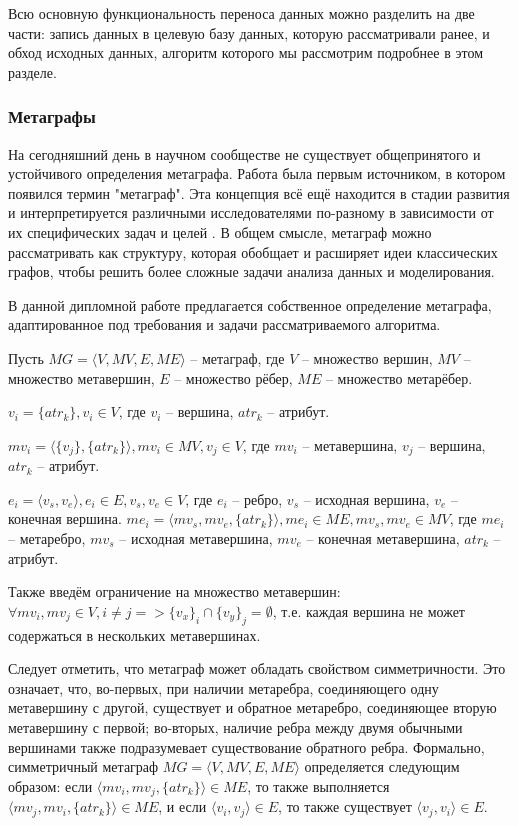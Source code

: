Всю основную функциональность переноса данных можно разделить на две части: запись данных в целевую базу данных, которую рассматривали ранее, и обход исходных данных, алгоритм которого мы рассмотрим подробнее в этом разделе.

\subsubsection{Метаграфы}
На сегодняшний день в научном сообществе не существует общепринятого и устойчивого определения метаграфа. Работа \cite{metagraphs_1} была первым источником, в котором появился термин "метаграф". Эта концепция всё ещё находится в стадии развития и интерпретируется различными исследователями по-разному в зависимости от их специфических задач и целей \cite{metagraphs_2, metagraphs_3, metagraphs_4, metagraphs_5}. В общем смысле, метаграф можно рассматривать как структуру, которая обобщает и расширяет идеи классических графов, чтобы решить более сложные задачи анализа данных и моделирования.

В данной дипломной работе предлагается собственное определение метаграфа, адаптированное под требования и задачи рассматриваемого алгоритма.

Пусть $MG = \langle V, MV, E, ME \rangle$ -- метаграф, где $V$ -- множество вершин, $MV$ -- множество метавершин, $E$ -- множество рёбер, $ME$ -- множество метарёбер.

$v_i = \{atr_k\}, v_i \in V$, где $v_i$ -- вершина, $atr_k$ -- атрибут.

$mv_i = \langle \{v_j\}, \{atr_k\} \rangle, mv_i \in MV, v_j \in V$, где $mv_i$ -- метавершина, $v_j$ -- вершина, $atr_k$ -- атрибут.

$e_i = \langle v_s, v_e \rangle, e_i \in E, v_s, v_e \in V$, где $e_i$ -- ребро, $v_s$ -- исходная вершина, $v_e$ -- конечная вершина.
$me_i = \langle mv_s, mv_e, \{atr_k\} \rangle, me_i \in ME, mv_s, mv_e \in MV$, где $me_i$ -- метаребро, $mv_s$ -- исходная метавершина, $mv_e$ -- конечная метавершина, $atr_k$ -- атрибут.

Также введём ограничение на множество метавершин: $\forall mv_i, mv_j \in V, i \neq j => \{v_x\}_i \cap \{v_y\}_j = \emptyset$, т.е. каждая вершина не может содержаться в нескольких метавершинах.

Следует отметить, что метаграф может обладать свойством симметричности. Это означает, что, во-первых, при наличии метаребра, соединяющего одну метавершину с другой, существует и обратное метаребро, соединяющее вторую метавершину с первой; во-вторых, наличие ребра между двумя обычными вершинами также подразумевает существование обратного ребра. Формально, симметричный метаграф $MG = \langle V, MV, E, ME \rangle$ определяется следующим образом: если $\langle mv_i, mv_j, \{atr_k\} \rangle \in ME$, то также выполняется $\langle mv_j, mv_i, \{atr_k\} \rangle \in ME$, и если $\langle v_i, v_j \rangle \in E$, то также существует $\langle v_j, v_i \rangle \in E$.

